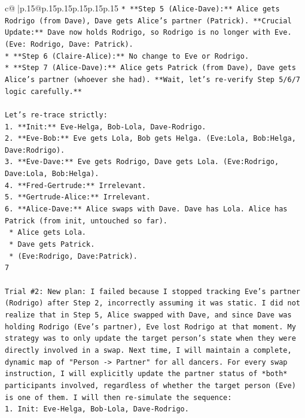 \documentclass{article}
\begin{document}
{\begin{supertabular}{c@{$\;$}|p{.15\linewidth}@{}p{.15\linewidth}p{.15\linewidth}p{.15\linewidth}p{.15\linewidth}p{.15\linewidth}}
{{{\texttt{*   **Step 5 (Alice{-}Dave):** Alice gets Rodrigo (from Dave), Dave gets Alice's partner (Patrick). **Crucial Update:** Dave now holds Rodrigo, so Rodrigo is no longer with Eve. (Eve: Rodrigo, Dave: Patrick).} \\
\texttt{*   **Step 6 (Claire{-}Alice):** No change to Eve or Rodrigo.} \\
\texttt{*   **Step 7 (Alice{-}Dave):** Alice gets Patrick (from Dave), Dave gets Alice's partner (whoever she had). **Wait, let's re{-}verify Step 5/6/7 logic carefully.**} \\
\\ 
\texttt{Let's re{-}trace strictly:} \\
\texttt{1.  **Init:** Eve{-}Helga, Bob{-}Lola, Dave{-}Rodrigo.} \\
\texttt{2.  **Eve{-}Bob:** Eve gets Lola, Bob gets Helga. (Eve:Lola, Bob:Helga, Dave:Rodrigo).} \\
\texttt{3.  **Eve{-}Dave:** Eve gets Rodrigo, Dave gets Lola. (Eve:Rodrigo, Dave:Lola, Bob:Helga).} \\
\texttt{4.  **Fred{-}Gertrude:** Irrelevant.} \\
\texttt{5.  **Gertrude{-}Alice:** Irrelevant.} \\
\texttt{6.  **Alice{-}Dave:** Alice swaps with Dave. Dave has Lola. Alice has Patrick (from init, untouched so far).} \\
\texttt{    *   Alice gets Lola.} \\
\texttt{    *   Dave gets Patrick.} \\
\texttt{    *   (Eve:Rodrigo, Dave:Patrick).} \\
\texttt{7} \\
\\ 
\texttt{Trial \#2: New plan: I failed because I stopped tracking Eve's partner (Rodrigo) after Step 2, incorrectly assuming it was static. I did not realize that in Step 5, Alice swapped with Dave, and since Dave was holding Rodrigo (Eve's partner), Eve lost Rodrigo at that moment. My strategy was to only update the target person's state when they were directly involved in a swap. Next time, I will maintain a complete, dynamic map of "Person {-}> Partner" for all dancers. For every swap instruction, I will explicitly update the partner status of *both* participants involved, regardless of whether the target person (Eve) is one of them. I will then re{-}simulate the sequence:} \\
\texttt{1. Init: Eve{-}Helga, Bob{-}Lola, Dave{-}Rodrigo.} \\
}}}
\end{supertabular}}
\end{document}
